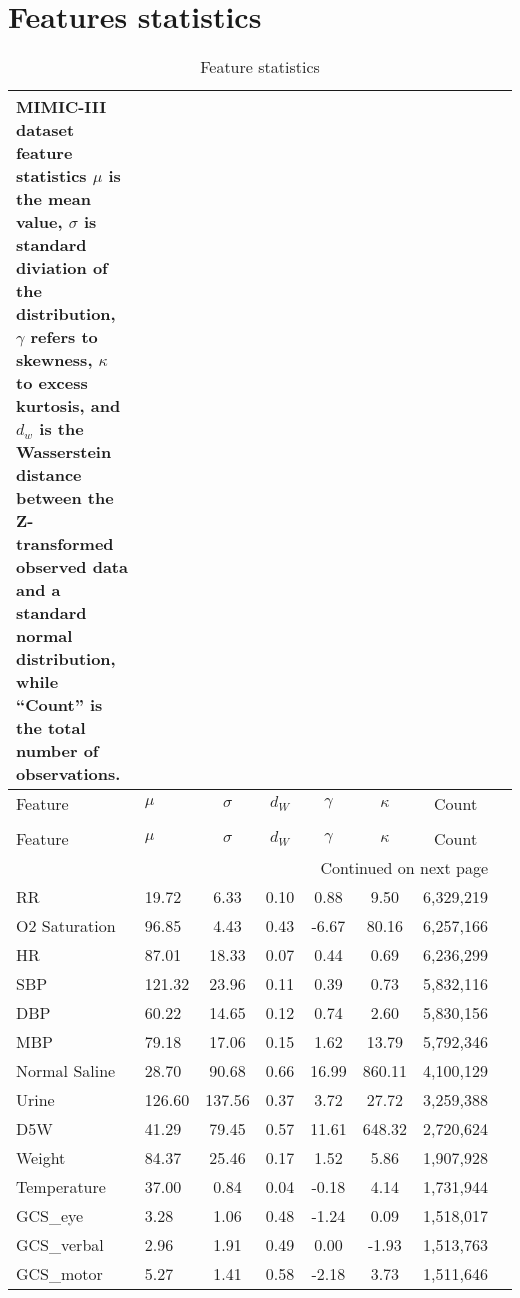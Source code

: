 \chapter{Features statistics}
\label{ch:features_statistics}


\begin{longtable}{p{3.5cm}lcccccc}
\caption{MIMIC-III dataset feature statistics \\
$\mu$ is the mean value, $\sigma$ is standard diviation of the distribution, $\gamma$ refers to skewness, $\kappa$ to excess kurtosis, and $d_w$ is the Wasserstein distance between the Z-transformed observed data and a standard normal distribution, while ``Count'' is the total number of observations.}
\label{tab:feature_statistics} \\
\toprule
Feature & $\mu$ & $\sigma$ & $d_W$ & $\gamma$ & $\kappa$ & Count \\
\midrule
\endfirsthead
\caption[]{Feature statistics} \\
\toprule
Feature & $\mu$ & $\sigma$ & $d_W$ & $\gamma$ & $\kappa$ & Count \\
\midrule
\endhead
\midrule
\multicolumn{7}{r}{Continued on next page} \\
\midrule
\endfoot
\bottomrule
\endlastfoot
RR & 19.72 & 6.33 & 0.10 & 0.88 & 9.50 & 6,329,219 \\
O2 Saturation & 96.85 & 4.43 & 0.43 & -6.67 & 80.16 & 6,257,166 \\
HR & 87.01 & 18.33 & 0.07 & 0.44 & 0.69 & 6,236,299 \\
SBP & 121.32 & 23.96 & 0.11 & 0.39 & 0.73 & 5,832,116 \\
DBP & 60.22 & 14.65 & 0.12 & 0.74 & 2.60 & 5,830,156 \\
MBP & 79.18 & 17.06 & 0.15 & 1.62 & 13.79 & 5,792,346 \\
Normal Saline & 28.70 & 90.68 & 0.66 & 16.99 & 860.11 & 4,100,129 \\
Urine & 126.60 & 137.56 & 0.37 & 3.72 & 27.72 & 3,259,388 \\
D5W & 41.29 & 79.45 & 0.57 & 11.61 & 648.32 & 2,720,624 \\
Weight & 84.37 & 25.46 & 0.17 & 1.52 & 5.86 & 1,907,928 \\
Temperature & 37.00 & 0.84 & 0.04 & -0.18 & 4.14 & 1,731,944 \\
GCS\_eye & 3.28 & 1.06 & 0.48 & -1.24 & 0.09 & 1,518,017 \\
GCS\_verbal & 2.96 & 1.91 & 0.49 & 0.00 & -1.93 & 1,513,763 \\
GCS\_motor & 5.27 & 1.41 & 0.58 & -2.18 & 3.73 & 1,511,646 \\

\end{longtable}

